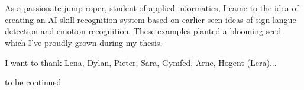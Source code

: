 
\chapter*{}%
\label{ch:voorwoord}


As a passionate jump roper, student of applied informatics, I came to the idea of creating an AI skill recognition system based on earlier seen ideas of sign langue detection and emotion recognition. These examples planted a blooming seed which I've proudly grown during my thesis.

I want to thank Lena, Dylan, Pieter, Sara, Gymfed, Arne, Hogent (Lera)...

to be continued